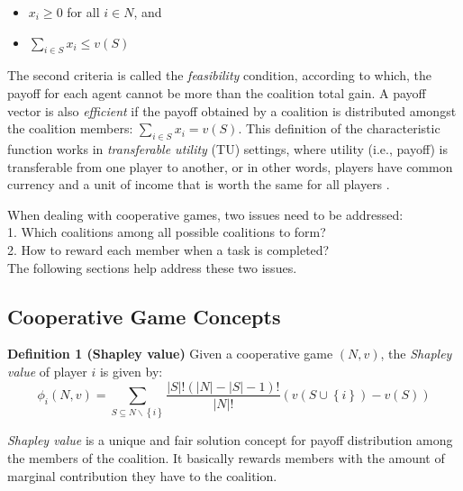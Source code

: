         \begin{itemize}
            \item $x_i \geq 0$ for all $i \in N$, and
            \item $\sum_{i \in S} x_i \leq v(S)$
        \end{itemize}

        The second criteria is called the \emph{feasibility} condition,
        according to which, the payoff for each agent cannot be more than
        the coalition total gain. A payoff vector is also \emph{efficient}
        if the payoff obtained by a coalition is distributed amongst the
        coalition members: $\sum_{i \in S} x_i = v(S)$. This definition of
        the characteristic function works in \emph{transferable utility}
        (TU) settings, where utility (i.e., payoff) is transferable from
        one player to another, or in other words, players have common
        currency and a unit of income that is worth the same for all players
        \cite{myerson1991game}.

        When dealing with cooperative games, two issues need to be
        addressed:\\ 1. Which coalitions among all possible coalitions to form? \\
        2. How to reward each member when a task is completed?\\
        The following sections help address these two issues.

        \subsection{Cooperative Game Concepts}


            {\bf Definition 1 (Shapley value)} Given a cooperative game $(N,
            v)$, the \emph{Shapley value} of player $i$ is given
            by\cite{shapley_value}:
            \begin{equation}\label{eq:shapley}
            \phi_i(N,v) = \sum_{S \subseteq N \backslash \left\{i\right\} }
            \frac{|S|! (|N|-|S|-1)!}{|N|!} (v(S \cup \left\{i\right\}) - v(S))
            \end{equation}

            \emph{Shapley value} is a unique and fair solution concept for
            payoff distribution among the members of the coalition. It
            basically rewards members with the amount of marginal contribution
            they have to the coalition.

